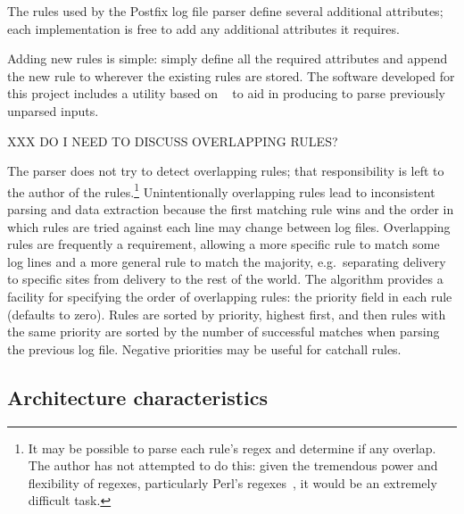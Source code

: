 \documentclass[draft]{svmult}
\begin{document}
The rules used by the Postfix log file parser define several additional
attributes; each implementation is free to add any additional attributes it
requires.

Adding new rules is simple: simply define all the required attributes and
append the new rule to wherever the existing rules are stored.  The
software developed for this project includes a utility based on
\SLCT{}~\cite{slct-paper} to aid in producing \regexes{} to parse
previously unparsed inputs.

\label{overlapping rules}

XXX DO I NEED TO DISCUSS OVERLAPPING RULES\@?

The parser does not try to detect overlapping rules; that responsibility is
left to the author of the rules.\footnote{It may be possible to parse each
rule's regex and determine if any overlap.  The author has not attempted to
do this: given the tremendous power and flexibility of regexes,
particularly Perl's regexes~\cite{perlre}, it would be an extremely
difficult task.} Unintentionally overlapping rules lead to inconsistent
parsing and data extraction because the first matching rule wins and the
order in which rules are tried against each line may change between log
files.  Overlapping rules are frequently a requirement, allowing a more
specific rule to match some log lines and a more general rule to match the
majority, e.g.\ separating \SMTP{} delivery to specific sites from \SMTP{}
delivery to the rest of the world.  The algorithm provides a facility for
specifying the order of overlapping rules: the priority field in each rule
(defaults to zero).  Rules are sorted by priority, highest first, and then
rules with the same priority are sorted by the number of successful matches
when parsing the previous log file.  Negative priorities may be useful for
catchall rules.



\subsection{Architecture characteristics}

\label{Architecture characteristics}
\end{document}
